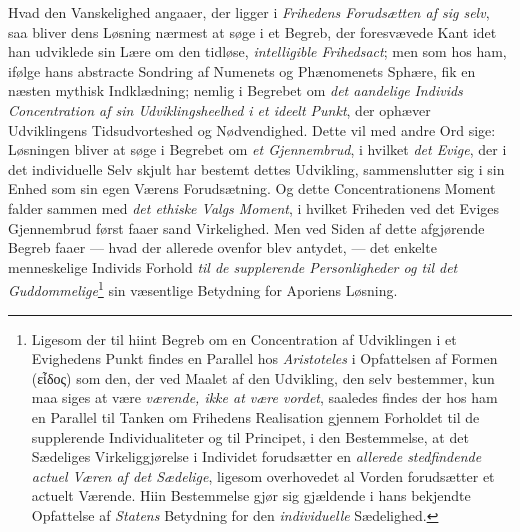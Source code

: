 Hvad den Vanskelighed angaaer, der ligger i \emph{Frihedens Forudsætten af sig
selv}, saa bliver dens Løsning nærmest at søge i et Begreb, der foresvævede Kant
idet han udviklede sin Lære om den tidløse, \emph{intelligible Frihedsact}; men
som hos ham, ifølge hans abstracte Sondring af Numenets og Phænomenets Sphære,
fik en næsten mythisk Indklædning; nemlig i Begrebet om \emph{det aandelige}
 \setcounter{footnote}{0}%
\emph{Individs Concentration af sin Udviklingsheelhed i et ideelt Punkt}, der
ophæver Udviklingens Tidsudvorteshed og Nødvendighed. Dette vil med andre Ord
sige: Løsningen bliver at søge i Begrebet om \emph{et Gjennembrud}, i hvilket
\emph{det Evige}, der i det individuelle Selv skjult har bestemt dettes
Udvikling, sammenslutter sig i sin Enhed som sin egen Værens Forudsætning. Og
dette Concentrationens Moment falder sammen med \emph{det ethiske Valgs Moment},
i hvilket Friheden ved det Eviges Gjennembrud først faaer sand Virkelighed. Men
ved Siden af dette afgjørende Begreb faaer --- hvad der allerede ovenfor blev
antydet, --- det enkelte menneskelige Individs Forhold \emph{til de supplerende
Personligheder og til det Guddommelige}\footnote{Ligesom der til hiint Begreb om
en Concentration af Udviklingen i et Evighedens Punkt findes en Parallel hos
\emph{Aristoteles} i Opfattelsen af Formen (εἶδος) som den, der ved Maalet af
den Udvikling, den selv bestemmer, kun maa siges at være \emph{værende, ikke at
være vordet}, saaledes findes der hos ham en Parallel til Tanken om Frihedens
Realisation gjennem Forholdet til de supplerende Individualiteter og til
Principet, i den Bestemmelse, at det Sædeliges Virkeliggjørelse i Individet
forudsætter en \emph{allerede stedfindende actuel Væren af det Sædelige},
ligesom overhovedet al Vorden forudsætter et actuelt Værende. Hiin Bestemmelse
gjør sig gjældende i hans bekjendte Opfattelse af \emph{Statens} Betydning for
den \emph{individuelle} Sædelighed.} sin væsentlige Betydning for Aporiens
Løsning.

